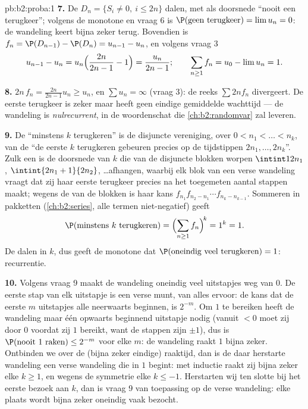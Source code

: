\begin{solution}{pb:b2:proba:1}
\textbf{7.} De  $D_n = \{S_i \neq 0,\ i \leq 2n\}$
dalen, met als doorsnede ``nooit een terugkeer''; volgens de
monotone  en vraag 6 is $\P(\text{geen terugkeer}) =
\lim u_n = 0$: de wandeling keert bijna zeker terug. Bovendien is
$f_n = \P(D_{n-1}) - \P(D_n) = u_{n-1} - u_n$, en volgens vraag 3
\[
u_{n-1} - u_n = u_n\Bigl(\frac{2n}{2n-1} - 1\Bigr) =
\frac{u_n}{2n-1};
\qquad
\sum_{n\geq1}f_n = u_0 - \lim u_n = 1 .
\]

\textbf{8.} $2n\,f_n = \frac{2n}{2n-1}u_n \geq u_n$, en $\sum u_n =
\infty$ (vraag 3): de reeks $\sum 2nf_n$ divergeert. De eerste
terugkeer is zeker maar heeft geen eindige gemiddelde wachttijd ---
de wandeling is \emph{nulrecurrent}, in de woordenschat die
\cref{ch:b2:randomvar} zal leveren.

\textbf{9.} De  ``minstens $k$ terugkeren'' is de
disjuncte  vereniging, over $0 < n_1 < \dots < n_k$, van
de  ``de eerste $k$ terugkeren gebeuren precies op de
tijdstippen $2n_1, \dots, 2n_k$''. Zulk een  is de
doorsnede van $k$  die van de disjuncte blokken
worpen $\intint1{2n_1}$, $\intint{2n_1+1}{2n_2}$, \dots afhangen,
waarbij elk blok van een verse wandeling vraagt dat zij haar eerste
terugkeer precies na het toegemeten aantal stappen maakt; wegens de
 van de blokken is haar kans
$f_{n_1}f_{n_2-n_1}\cdots f_{n_k-n_{k-1}}$. Sommeren in pakketten
(\cref{ch:b2:series}, alle termen niet-negatief) geeft
\[
\P(\text{minstens }k\text{ terugkeren})
= \Bigl(\sum_{n\geq1}f_n\Bigr)^{\!k} = 1^k = 1 .
\]
De  dalen in $k$, dus geeft de monotone 
dat $\P(\text{oneindig veel terugkeren}) = 1$: recurrentie.

\textbf{10.} Volgens vraag 9 maakt de wandeling oneindig veel
uitstapjes weg van $0$. De eerste stap van elk uitstapje is een
verse munt,  van alles ervoor: de kans dat de eerste
$m$ uitstapjes alle neerwaarts beginnen, is $2^{-m}$. Om $1$ te
bereiken heeft de wandeling maar één opwaarts beginnend uitstapje
nodig (vanuit $<0$ moet zij door $0$ voordat zij $1$ bereikt, want
de stappen zijn $\pm1$), dus is $\P(\text{nooit }1\text{ raken})
\leq 2^{-m}$ voor elke $m$: de wandeling raakt $1$ bijna zeker.
Ontbinden we over de (bijna zeker eindige) raaktijd, dan is de daar
herstarte wandeling een verse wandeling die in $1$ begint: met
inductie raakt zij bijna zeker elke $k \geq 1$, en wegens de
symmetrie elke $k \leq -1$. Herstarten wij ten slotte bij het
eerste bezoek aan $k$, dan is vraag 9 van toepassing op de verse
wandeling: elke plaats wordt bijna zeker oneindig vaak bezocht.


\end{solution}
